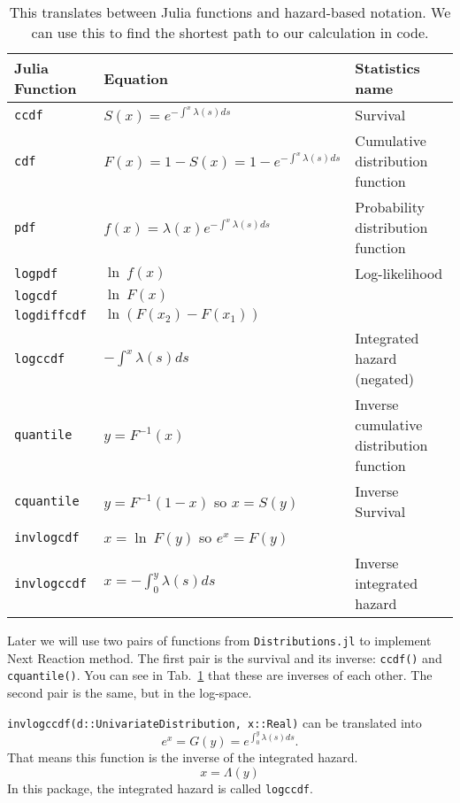 \documentclass{article}
\begin{document}
\begin{table}
\begin{tabular}{lll}
	Julia Function & Equation & Statistics name \\ \hline
	\texttt{ccdf} & $S(x) = e^{-\int^x\lambda(s)ds}$ & Survival \\
	\texttt{cdf} & $F(x) = 1 - S(x) = 1-e^{-\int^x\lambda(s)ds}$ & Cumulative distribution function \\
	\texttt{pdf} & $f(x) = \lambda(x)e^{-\int^x\lambda(s)ds}$ & Probability distribution function \\
	\texttt{logpdf} & $\ln\:f(x)$ & Log-likelihood \\
	\texttt{logcdf} & $\ln\:F(x)$ & \\
	\texttt{logdiffcdf} & $\ln\left(F(x_2)-F(x_1)\right)$ & \\
	\texttt{logccdf} & $-\int^x\lambda(s)ds$ & Integrated hazard (negated) \\
	\texttt{quantile} & $y = F^{-1}(x)$ & Inverse cumulative distribution function \\
	\texttt{cquantile} & $y = F^{-1}(1-x)$ so $x = S(y)$ & Inverse Survival \\
	\texttt{invlogcdf} & $x = \ln\:F(y)$ so $e^x = F(y)$ & \\
	\texttt{invlogccdf} & $x = -\int_0^y\lambda(s)ds$ & Inverse integrated hazard
\end{tabular}
\caption{This translates between Julia functions and hazard-based notation. We can use this to find
the shortest path to our calculation in code.\label{julia-translation}}
\end{table}

Later we will use two pairs of functions from \texttt{Distributions.jl} to implement Next Reaction method. The first pair is the survival and its inverse: \texttt{ccdf()} and \texttt{cquantile()}. You can see in Tab.~\ref{julia-translation} that these are inverses of each other. The second pair is the same, but in the log-space.

\texttt{invlogccdf(d::UnivariateDistribution, x::Real)} can be translated into
\begin{equation}
e^x = G(y) = e^{\int_0^y\lambda(s)ds}.
\end{equation}
That means this function is the inverse of the integrated hazard.
\begin{equation}
x = \Lambda(y)
\end{equation}
In this package, the integrated hazard is called \texttt{logccdf}.
\end{document}
